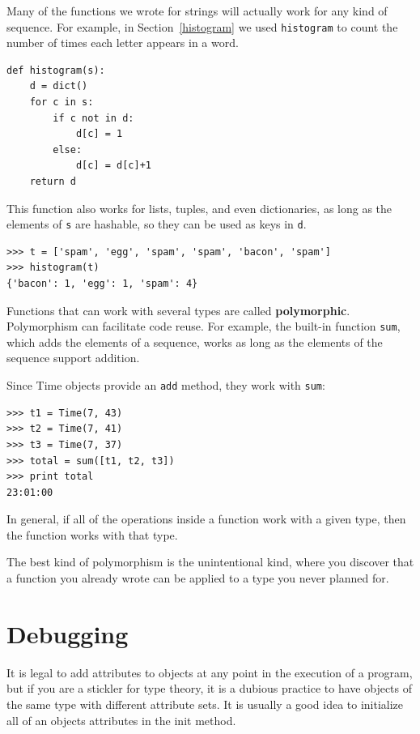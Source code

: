 \documentclass[10pt]{book}
\begin{document}
\begin{CJK}{UTF8}{gbsn}
Many of the functions we wrote for strings will actually
work for any kind of sequence.
For example, in Section~\ref{histogram}
we used {\tt histogram} to count the number of times each letter
appears in a word.

\begin{verbatim}
def histogram(s):
    d = dict()
    for c in s:
        if c not in d:
            d[c] = 1
        else:
            d[c] = d[c]+1
    return d
\end{verbatim}
%
This function also works for lists, tuples, and even dictionaries,
as long as the elements of {\tt s} are hashable, so they can be used
as keys in {\tt d}.

\begin{verbatim}
>>> t = ['spam', 'egg', 'spam', 'spam', 'bacon', 'spam']
>>> histogram(t)
{'bacon': 1, 'egg': 1, 'spam': 4}
\end{verbatim}
%
Functions that can work with several types are called {\bf polymorphic}.
Polymorphism can facilitate code reuse.  For example, the built-in
function {\tt sum}, which adds the elements of a sequence, works
as long as the elements of the sequence support addition.

Since Time objects provide an {\tt add} method, they work
with {\tt sum}:

\begin{verbatim}
>>> t1 = Time(7, 43)
>>> t2 = Time(7, 41)
>>> t3 = Time(7, 37)
>>> total = sum([t1, t2, t3])
>>> print total
23:01:00
\end{verbatim}
%
In general, if all of the operations inside a function 
work with a given type, then the function works with that type.

The best kind of polymorphism is the unintentional kind, where
you discover that a function you already wrote can be
applied to a type you never planned for.


\section{Debugging}

It is legal to add attributes to objects at any point in the execution
of a program, but if you are a stickler for type theory, it is a
dubious practice to have objects of the same type with different
attribute sets.  It is usually a good idea to
initialize all of an objects attributes in the init method.


\end{CJK}
\end{document}

